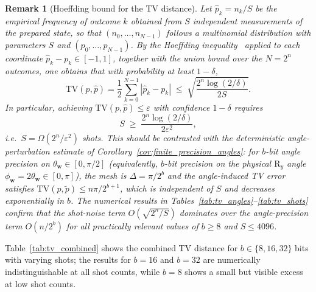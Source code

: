 \documentclass{article}
\newtheorem{remark}[theorem]{Remark}
\newcommand{\RY}{\mathrm{R}_y}
\numberwithin{equation}{section}
\begin{document}
\begin{remark}[Hoeffding bound for the TV distance]
\label{rem:hoeffding_tv}
Let $\hat p_k = n_k/S$ be the empirical frequency of outcome $k$ obtained from $S$ independent
measurements of the prepared state, so that $(n_0,\dots,n_{N-1})$ follows a multinomial
distribution with parameters $S$ and $(p_0,\dots,p_{N-1})$.
By the Hoeffding inequality~\cite{Hoeffding1963} applied to each coordinate
$\hat p_k - p_k\in[-1,1]$, together with the union bound over the $N=2^n$ outcomes,
one obtains that with probability at least $1-\delta$,
\[
\mathrm{TV}(p,\hat p)
=
\frac{1}{2}\sum_{k=0}^{N-1}|\hat p_k - p_k|
\;\le\;
\sqrt{\frac{2^n\log(2/\delta)}{2S}}.
\]
In particular, achieving $\mathrm{TV}(p,\hat p)\le\varepsilon$ with confidence $1-\delta$ requires
\[
S\;\ge\;\frac{2^n\log(2/\delta)}{2\varepsilon^2},
\]
i.e.\ $S=\Omega(2^n/\varepsilon^2)$ shots.
This should be contrasted with the deterministic angle-perturbation estimate
of Corollary~\ref{cor:finite_precision_angles}: for $b$-bit angle precision on
$\theta_{\mathbf{w}}\in[0,\pi/2]$ (equivalently, $b$-bit precision on the physical
$\RY$ angle $\phi_{\mathbf{w}}=2\theta_{\mathbf{w}}\in[0,\pi]$), the mesh is
$\Delta=\pi/2^b$ and the angle-induced TV error satisfies
$\mathrm{TV}(p,\tilde p)\le n\pi/2^{b+1}$, which is independent of $S$ and decreases
\emph{exponentially} in $b$.
The numerical results in Tables~\ref{tab:tv_angles}--\ref{tab:tv_shots} confirm
that the shot-noise term $O(\sqrt{2^n/S})$ dominates over the angle-precision term
$O(n/2^b)$ for all practically relevant values of $b\ge 8$ and $S\le 4096$.
\end{remark}
Table~\ref{tab:tv_combined} shows the combined TV distance for $b\in\{8,16,32\}$ bits
with varying shots; the results for $b=16$ and $b=32$ are numerically indistinguishable
at all shot counts, while $b=8$ shows a small but visible excess at low shot counts.
\end{document}
